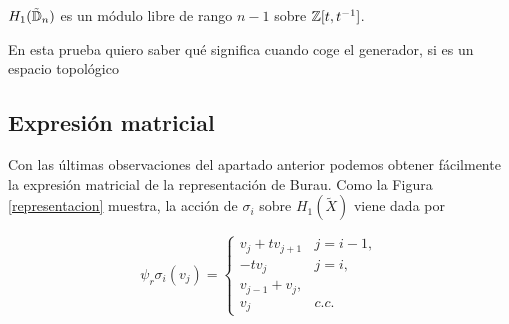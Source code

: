 \documentclass[TFG.tex]{subfiles}
\begin{document}
\begin{prop}
$H_1(\tilde{\mathbb{D}}_n)$ es un módulo libre de rango $n-1$ sobre $\mathbb{Z}[t,t^{-1}]$.
\end{prop}
\begin{dem}
En esta prueba quiero saber qué significa cuando coge el generador, si es un espacio topológico
\end{dem}




\subsection{Expresión matricial}
Con las últimas observaciones del apartado anterior podemos obtener fácilmente la expresión matricial de la representación de Burau. Como la Figura \ref{representacion} muestra, la acción de $\sigma_i$ sobre $H_1(\tilde{X})$ viene dada por

\[
\psi_r\sigma_i(v_j)=\begin{cases}
v_j+tv_{j+1} & j=i-1,\\
-tv_j & j=i,\\
v_{j-1}+v_j,\\
v_j & c.c.
\end{cases}
\]
\end{document}
